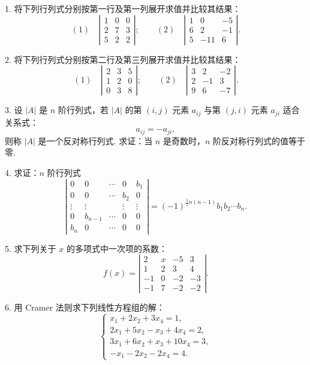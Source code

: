 \documentclass[UTF8,12pt,a4paper,fontset=fandol]{ctexart}
\begin{document}
1. 将下列行列式分别按第一行及第一列展开求值并比较其结果：
\[
(1)\quad
\left|\begin{array}{ccc}
1 & 0 & 0\\
2 & 7 & 3\\
5 & 2 & 2
\end{array}\right|;
\qquad
(2)\quad
\left|\begin{array}{ccc}
1 & 0 & -5\\
6 & 2 & -1\\
5 & -11 & 6
\end{array}\right|.
\]

2. 将下列行列式分别按第二行及第三列展开求值并比较其结果：
\[
(1)\quad
\left|\begin{array}{ccc}
2 & 3 & 5\\
1 & 2 & 0\\
0 & 3 & 8
\end{array}\right|;
\qquad
(2)\quad
\left|\begin{array}{ccc}
3 & 2 & -2\\
2 & -1 & 3\\
9 & 6 & -7
\end{array}\right|.
\]

3. 设 $|A|$ 是 $n$ 阶行列式，若 $|A|$ 的第 $(i,j)$ 元素 $a_{ij}$ 与第 $(j,i)$ 元素 $a_{ji}$ 适合关系式：
\[
a_{ij}=-a_{ji},
\]
则称 $|A|$ 是一个反对称行列式. 求证：当 $n$ 是奇数时，$n$ 阶反对称行列式的值等于零.

4. 求证：$n$ 阶行列式
\[
\left|\begin{array}{ccccc}
0 & 0 & \cdots & 0 & b_1\\
0 & 0 & \cdots & b_2 & 0\\
\vdots & \vdots & & \vdots & \vdots\\
0 & b_{n-1} & \cdots & 0 & 0\\
b_n & 0 & \cdots & 0 & 0
\end{array}\right|
=(-1)^{\frac{1}{2}n(n-1)}b_1b_2\cdots b_n.
\]

5. 求下列关于 $x$ 的多项式中一次项的系数：
\[
f(x)=
\left|\begin{array}{cccc}
2 & x & -5 & 3\\
1 & 2 & 3 & 4\\
-1 & 0 & -2 & -3\\
-1 & 7 & -2 & -2
\end{array}\right|.
\]

6. 用 Cramer 法则求下列线性方程组的解：
\[
\left\{
\begin{array}{l}
x_1+2x_2+3x_4=1,\\
2x_1+5x_2-x_3+4x_4=2,\\
3x_1+6x_2+x_3+10x_4=3,\\
-x_1-2x_2-2x_4=4.
\end{array}
\right.
\]
\end{document}
